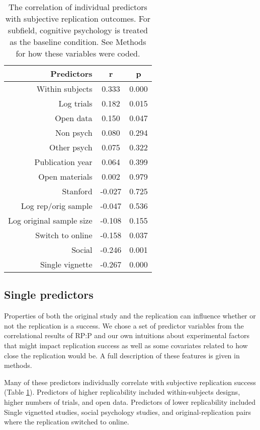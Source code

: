 \documentclass[
  english,
  a4paper,
]{article}
\begin{document}
\begin{table}[!h]

\caption{\label{tab:cor}The correlation of individual predictors with subjective replication outcomes. For subfield, cognitive psychology is treated as the baseline condition. See Methods for how these variables were coded.}
\centering
\fontsize{10}{12}\selectfont
\begin{tabular}[t]{r|c|c}
\hline
Predictors & r & p\\
\hline
Within subjects & 0.333 & 0.000\\
\hline
Log trials & 0.182 & 0.015\\
\hline
Open data & 0.150 & 0.047\\
\hline
Non psych & 0.080 & 0.294\\
\hline
Other psych & 0.075 & 0.322\\
\hline
Publication year & 0.064 & 0.399\\
\hline
Open materials & 0.002 & 0.979\\
\hline
Stanford & -0.027 & 0.725\\
\hline
Log rep/orig sample & -0.047 & 0.536\\
\hline
Log original sample size & -0.108 & 0.155\\
\hline
Switch to online & -0.158 & 0.037\\
\hline
Social & -0.246 & 0.001\\
\hline
Single vignette & -0.267 & 0.000\\
\hline
\end{tabular}
\end{table}

\hypertarget{single-predictors}{%
\subsection{Single predictors}\label{single-predictors}}

Properties of both the original study and the replication can influence whether or not the replication is a success. We chose a set of predictor variables from the correlational results of RP:P and our own intuitions about experimental factors that might impact replication success as well as some covariates related to how close the replication would be. A full description of these features is given in methods.

Many of these predictors individually correlate with subjective replication success (Table \ref{tab:cor}). Predictors of higher replicability included within-subjects designs, higher numbers of trials, and open data. Predictors of lower replicability included Single vignetted studies, social psychology studies, and original-replication pairs where the replication switched to online.
\end{document}
